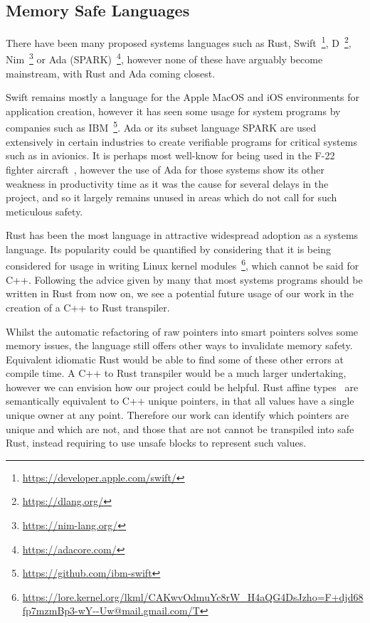 \documentclass{proposal}
\begin{document}
    \subsection{Memory Safe Languages}\label{subsec:rust}

    There have been many proposed systems languages such as Rust, Swift~\footnote{\url{https://developer.apple.com/swift/}}, D~\footnote{\url{https://dlang.org/}}, Nim~\footnote{\url{https://nim-lang.org/}} or Ada (SPARK)~\footnote{\url{https://adacore.com/}}, however none of these have arguably become mainstream, with Rust and Ada coming closest.

    Swift remains mostly a language for the Apple MacOS and iOS environments for application creation, however it has seen some usage for system programs by companies such as IBM~\footnote{\url{https://github.com/ibm-swift}}.
    Ada or its subset language SPARK are used extensively in certain industries to create verifiable programs for critical systems such as in avionics.
    It is perhaps most well-know for being used in the F-22 fighter aircraft~\cite{malas1997f}, however the use of Ada for those systems show its other weakness in productivity time as it was the cause for several delays in the project, and so it largely remains unused in areas which do not call for such meticulous safety.

    Rust has been the most language in attractive widespread adoption as a systems language.
    Its popularity could be quantified by considering that it is being considered for usage in writing Linux kernel modules~\footnote{\url{https://lore.kernel.org/lkml/CAKwvOdmuYc8rW_H4aQG4DsJzho=F+djd68fp7mzmBp3-wY--Uw@mail.gmail.com/T}}, which cannot be said for C++.
    Following the advice given by many that most systems programs should be written in Rust from now on, we see a potential future usage of our work in the creation of a C++ to Rust transpiler.

    Whilst the automatic refactoring of raw pointers into smart pointers solves some memory issues, the language still offers other ways to invalidate memory safety.
    Equivalent idiomatic Rust would be able to find some of these other errors at compile time.
    A C++ to Rust transpiler would be a much larger undertaking, however we can envision how our project could be helpful.
    Rust affine types~\cite{Balasubramanian2017} are semantically equivalent to C++ unique pointers, in that all values have a single unique owner at any point.
    Therefore our work can identify which pointers are unique and which are not, and those that are not cannot be transpiled into safe Rust, instead requiring to use unsafe blocks to represent such values.
\end{document}
